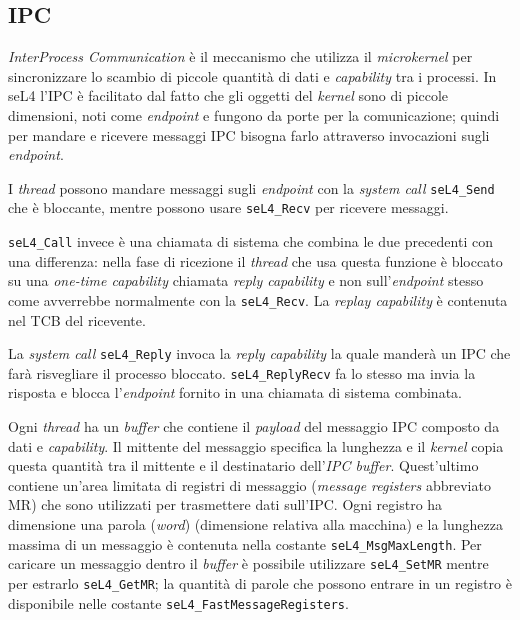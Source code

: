 \subsection{IPC}
\textit{InterProcess Communication} è il meccanismo che utilizza il \textit{microkernel} per sincronizzare lo scambio di  piccole quantità di dati e \textit{capability} tra i processi. In seL4 l'IPC è facilitato dal fatto che gli oggetti del \textit{kernel} sono di piccole dimensioni, noti come \textit{endpoint} e fungono da porte per la comunicazione; quindi per mandare e ricevere messaggi IPC bisogna farlo attraverso invocazioni sugli \textit{endpoint}.

I \textit{thread} possono mandare messaggi sugli \textit{endpoint} con la \textit{system call} \texttt{seL4\_Send} che è bloccante, mentre possono usare \texttt{seL4\_Recv} per ricevere messaggi.

\texttt{seL4\_Call} invece è una chiamata di sistema che combina le due precedenti con una differenza: nella fase di ricezione il \textit{thread} che usa questa funzione è bloccato su una \textit{one-time capability} chiamata \textit{reply capability} e non sull'\textit{endpoint} stesso come avverrebbe normalmente con la \texttt{seL4\_Recv}. La \textit{replay capability} è contenuta nel TCB del ricevente.

La \textit{system call} \texttt{seL4\_Reply} invoca la \textit{reply capability} la quale manderà un IPC che farà risvegliare il processo bloccato. \texttt{seL4\_ReplyRecv} fa lo stesso ma invia la risposta e blocca l'\textit{endpoint} fornito in una chiamata di sistema combinata.

Ogni \textit{thread} ha un \textit{buffer} che contiene il \textit{payload} del messaggio IPC composto da dati e \textit{capability}. Il mittente del messaggio specifica la lunghezza e il \textit{kernel} copia questa quantità tra il mittente e il destinatario dell'\textit{IPC buffer}. Quest'ultimo contiene un'area limitata di registri di messaggio (\textit{message registers} abbreviato MR) che sono utilizzati per trasmettere dati sull'IPC. Ogni registro ha dimensione una parola (\textit{word}) (dimensione relativa alla macchina) e la lunghezza massima di un messaggio è contenuta nella costante \texttt{seL4\_MsgMaxLength}. Per caricare un messaggio dentro il \textit{buffer} è possibile utilizzare \texttt{seL4\_SetMR} mentre per estrarlo \texttt{seL4\_GetMR}; la quantità di parole che possono entrare in un registro è disponibile nelle costante \texttt{seL4\_FastMessageRegisters}.

